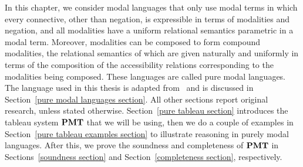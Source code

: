 \par In this chapter, we consider modal languages that only use modal terms in which every connective, other than negation,  is expressible in terms of modalities and negation, and all modalities have a uniform relational semantics parametric in a modal term. Moreover, modalities can be composed to form compound modalities, the relational semantics of which are given naturally and uniformly in terms of the composition of the accessibility relations corresponding to the modalities being composed. These languages are called pure modal languages. The language used in this thesis is adapted from~\cite{goranko2006elementary} and is discussed in Section~\ref{pure modal languages section}. All other sections report original research, unless stated otherwise. Section~\ref{pure tableau section} introduces the tableau system $\textbf{PMT}$ that we will be using, then we do a couple of examples in Section~\ref{pure tableau examples section} to illustrate reasoning in purely modal languages. After this, we prove the soundness and completeness of $\textbf{PMT}$ in Sections~\ref{soundness section} and Section~\ref{completeness section}, respectively.